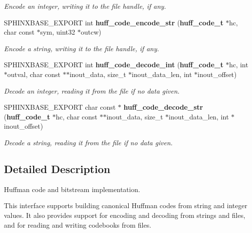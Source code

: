 \begin{DoxyCompactItemize}
\begin{DoxyCompactList}\small\item\em Encode an integer, writing it to the file handle, if any. \end{DoxyCompactList}\item 
S\+P\+H\+I\+N\+X\+B\+A\+S\+E\+\_\+\+E\+X\+P\+O\+R\+T int {\bf huff\+\_\+code\+\_\+encode\+\_\+str} ({\bf huff\+\_\+code\+\_\+t} $\ast$hc, char const $\ast$sym, uint32 $\ast$outcw)\label{huff__code_8h_a24fe76f501a7a0485f3e9485c60fae32}

\begin{DoxyCompactList}\small\item\em Encode a string, writing it to the file handle, if any. \end{DoxyCompactList}\item 
S\+P\+H\+I\+N\+X\+B\+A\+S\+E\+\_\+\+E\+X\+P\+O\+R\+T int {\bf huff\+\_\+code\+\_\+decode\+\_\+int} ({\bf huff\+\_\+code\+\_\+t} $\ast$hc, int $\ast$outval, char const $\ast$$\ast$inout\+\_\+data, size\+\_\+t $\ast$inout\+\_\+data\+\_\+len, int $\ast$inout\+\_\+offset)\label{huff__code_8h_a9155dd07a0a24393ef0e4e66cb314140}

\begin{DoxyCompactList}\small\item\em Decode an integer, reading it from the file if no data given. \end{DoxyCompactList}\item 
S\+P\+H\+I\+N\+X\+B\+A\+S\+E\+\_\+\+E\+X\+P\+O\+R\+T char const $\ast$ {\bf huff\+\_\+code\+\_\+decode\+\_\+str} ({\bf huff\+\_\+code\+\_\+t} $\ast$hc, char const $\ast$$\ast$inout\+\_\+data, size\+\_\+t $\ast$inout\+\_\+data\+\_\+len, int $\ast$inout\+\_\+offset)\label{huff__code_8h_aec0908ece3a695f8a3f6619d8d726e57}

\begin{DoxyCompactList}\small\item\em Decode a string, reading it from the file if no data given. \end{DoxyCompactList}\end{DoxyCompactItemize}


\subsection{Detailed Description}
Huffman code and bitstream implementation. 

This interface supports building canonical Huffman codes from string and integer values. It also provides support for encoding and decoding from strings and files, and for reading and writing codebooks from files. 